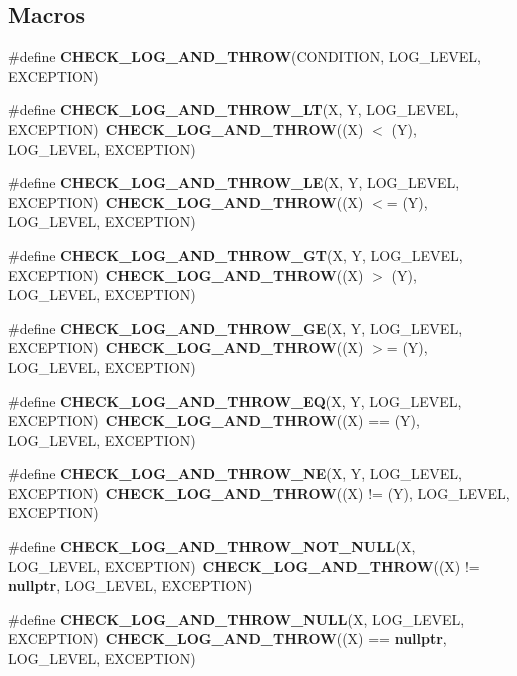 \subsection*{Macros}
\begin{DoxyCompactItemize}
\item 
\#define {\bf C\+H\+E\+C\+K\+\_\+\+L\+O\+G\+\_\+\+A\+N\+D\+\_\+\+T\+H\+R\+OW}(C\+O\+N\+D\+I\+T\+I\+ON,  L\+O\+G\+\_\+\+L\+E\+V\+EL,  E\+X\+C\+E\+P\+T\+I\+ON)
\item 
\#define {\bf C\+H\+E\+C\+K\+\_\+\+L\+O\+G\+\_\+\+A\+N\+D\+\_\+\+T\+H\+R\+O\+W\+\_\+\+LT}(X,  Y,  L\+O\+G\+\_\+\+L\+E\+V\+EL,  E\+X\+C\+E\+P\+T\+I\+ON)~{\bf C\+H\+E\+C\+K\+\_\+\+L\+O\+G\+\_\+\+A\+N\+D\+\_\+\+T\+H\+R\+OW}((X) $<$ (Y), L\+O\+G\+\_\+\+L\+E\+V\+EL, E\+X\+C\+E\+P\+T\+I\+ON)
\item 
\#define {\bf C\+H\+E\+C\+K\+\_\+\+L\+O\+G\+\_\+\+A\+N\+D\+\_\+\+T\+H\+R\+O\+W\+\_\+\+LE}(X,  Y,  L\+O\+G\+\_\+\+L\+E\+V\+EL,  E\+X\+C\+E\+P\+T\+I\+ON)~{\bf C\+H\+E\+C\+K\+\_\+\+L\+O\+G\+\_\+\+A\+N\+D\+\_\+\+T\+H\+R\+OW}((X) $<$= (Y), L\+O\+G\+\_\+\+L\+E\+V\+EL, E\+X\+C\+E\+P\+T\+I\+ON)
\item 
\#define {\bf C\+H\+E\+C\+K\+\_\+\+L\+O\+G\+\_\+\+A\+N\+D\+\_\+\+T\+H\+R\+O\+W\+\_\+\+GT}(X,  Y,  L\+O\+G\+\_\+\+L\+E\+V\+EL,  E\+X\+C\+E\+P\+T\+I\+ON)~{\bf C\+H\+E\+C\+K\+\_\+\+L\+O\+G\+\_\+\+A\+N\+D\+\_\+\+T\+H\+R\+OW}((X) $>$ (Y), L\+O\+G\+\_\+\+L\+E\+V\+EL, E\+X\+C\+E\+P\+T\+I\+ON)
\item 
\#define {\bf C\+H\+E\+C\+K\+\_\+\+L\+O\+G\+\_\+\+A\+N\+D\+\_\+\+T\+H\+R\+O\+W\+\_\+\+GE}(X,  Y,  L\+O\+G\+\_\+\+L\+E\+V\+EL,  E\+X\+C\+E\+P\+T\+I\+ON)~{\bf C\+H\+E\+C\+K\+\_\+\+L\+O\+G\+\_\+\+A\+N\+D\+\_\+\+T\+H\+R\+OW}((X) $>$= (Y), L\+O\+G\+\_\+\+L\+E\+V\+EL, E\+X\+C\+E\+P\+T\+I\+ON)
\item 
\#define {\bf C\+H\+E\+C\+K\+\_\+\+L\+O\+G\+\_\+\+A\+N\+D\+\_\+\+T\+H\+R\+O\+W\+\_\+\+EQ}(X,  Y,  L\+O\+G\+\_\+\+L\+E\+V\+EL,  E\+X\+C\+E\+P\+T\+I\+ON)~{\bf C\+H\+E\+C\+K\+\_\+\+L\+O\+G\+\_\+\+A\+N\+D\+\_\+\+T\+H\+R\+OW}((X) == (Y), L\+O\+G\+\_\+\+L\+E\+V\+EL, E\+X\+C\+E\+P\+T\+I\+ON)
\item 
\#define {\bf C\+H\+E\+C\+K\+\_\+\+L\+O\+G\+\_\+\+A\+N\+D\+\_\+\+T\+H\+R\+O\+W\+\_\+\+NE}(X,  Y,  L\+O\+G\+\_\+\+L\+E\+V\+EL,  E\+X\+C\+E\+P\+T\+I\+ON)~{\bf C\+H\+E\+C\+K\+\_\+\+L\+O\+G\+\_\+\+A\+N\+D\+\_\+\+T\+H\+R\+OW}((X) != (Y), L\+O\+G\+\_\+\+L\+E\+V\+EL, E\+X\+C\+E\+P\+T\+I\+ON)
\item 
\#define {\bf C\+H\+E\+C\+K\+\_\+\+L\+O\+G\+\_\+\+A\+N\+D\+\_\+\+T\+H\+R\+O\+W\+\_\+\+N\+O\+T\+\_\+\+N\+U\+LL}(X,  L\+O\+G\+\_\+\+L\+E\+V\+EL,  E\+X\+C\+E\+P\+T\+I\+ON)~{\bf C\+H\+E\+C\+K\+\_\+\+L\+O\+G\+\_\+\+A\+N\+D\+\_\+\+T\+H\+R\+OW}((X) != {\bf nullptr}, L\+O\+G\+\_\+\+L\+E\+V\+EL, E\+X\+C\+E\+P\+T\+I\+ON)
\item 
\#define {\bf C\+H\+E\+C\+K\+\_\+\+L\+O\+G\+\_\+\+A\+N\+D\+\_\+\+T\+H\+R\+O\+W\+\_\+\+N\+U\+LL}(X,  L\+O\+G\+\_\+\+L\+E\+V\+EL,  E\+X\+C\+E\+P\+T\+I\+ON)~{\bf C\+H\+E\+C\+K\+\_\+\+L\+O\+G\+\_\+\+A\+N\+D\+\_\+\+T\+H\+R\+OW}((X) == {\bf nullptr}, L\+O\+G\+\_\+\+L\+E\+V\+EL, E\+X\+C\+E\+P\+T\+I\+ON)
\end{DoxyCompactItemize}
